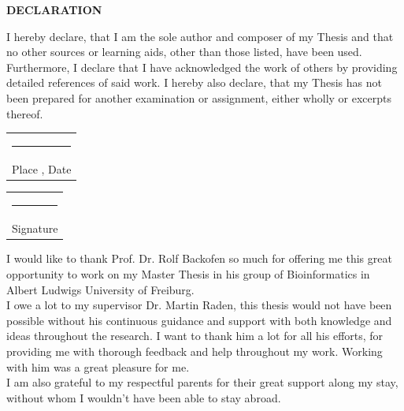 \documentclass[twoside,a4paper]{report}
\begin{document}


\newpage
\begin{center}

\textbf{ \Large DECLARATION}\\
	
\end{center}
 	\vspace{0.9cm}
I hereby declare, that I am the sole author and composer of my Thesis and that no
other sources or learning aids, other than those listed, have been used. Furthermore, I declare that I have acknowledged the work of others by providing detailed references of said work. I hereby also declare, that my Thesis has not been prepared for another examination or assignment, either wholly or excerpts thereof.
\\

\hfill%
\vspace{0.9cm}

\begin{tabular}[t]{c}
	
	\rule{10em}{0.4pt}\\ Place , Date
\end{tabular}%
\hfill%
\begin{tabular}[t]{c}
	\rule{10em}{0.4pt}\\ Signature
\end{tabular}%


\newpage

I would like to thank Prof. Dr. Rolf Backofen so much for offering me this great opportunity to work on my Master Thesis in his group of Bioinformatics in Albert Ludwigs University of Freiburg.\\

I owe a lot to my supervisor Dr. Martin Raden, this thesis would not have been possible without his continuous guidance and support with both knowledge and ideas throughout the research. I want to thank him a lot for all his efforts, for providing me with thorough feedback and help throughout my work. Working with him was a great pleasure for me.\\

I am also grateful to my respectful parents for their great support along my stay,
without whom I wouldn’t have been able to stay abroad.\\
\end{document}
